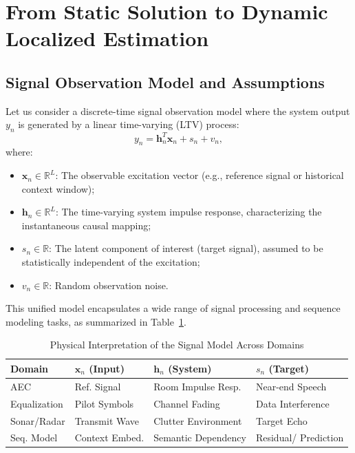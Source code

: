 \documentclass[conference]{IEEEtran}
\begin{document}
\section{From Static Solution to Dynamic Localized Estimation}
\label{sec:formulation}

\subsection{Signal Observation Model and Assumptions}
Let us consider a discrete-time signal observation model where the system output $y_n$ is generated by a linear time-varying (LTV) process:
\begin{equation}
y_n = \mathbf{h}_n^T \mathbf{x}_n + s_n + v_n,
\label{eq:obs_model}
\end{equation}
where:
\begin{itemize}
    \item $\mathbf{x}_n \in \mathbb{R}^L$: The observable excitation vector (e.g., reference signal or historical context window);
    \item $\mathbf{h}_n \in \mathbb{R}^L$: The time-varying system impulse response, characterizing the instantaneous causal mapping;
    \item $s_n \in \mathbb{R}$: The latent component of interest (target signal), assumed to be statistically independent of the excitation;
    \item $v_n \in \mathbb{R}$: Random observation noise.
\end{itemize}

This unified model encapsulates a wide range of signal processing and sequence modeling tasks, as summarized in Table~\ref{tab:mapping}.

\begin{table}[htbp]
\centering
\caption{Physical Interpretation of the Signal Model Across Domains}
\label{tab:mapping}
\scriptsize 
\setlength{\tabcolsep}{2pt} 
\renewcommand{\arraystretch}{1.2} %
\begin{tabular}{@{}p{} p{} p{} p{}@{}}
\toprule
\textbf{Domain} & $\mathbf{x}_n$ (Input) & $\mathbf{h}_n$ (System) & $s_n$ (Target) \\ \midrule
AEC & Ref. Signal & Room Impulse Resp. & Near-end Speech \\
Equalization & Pilot Symbols & Channel Fading & Data Interference \\
Sonar/Radar & Transmit Wave & Clutter Environment & Target Echo \\
Seq. Model & Context Embed. & Semantic Dependency & Residual/ Prediction \\ \bottomrule
\end{tabular}
\end{table}
\end{document}
